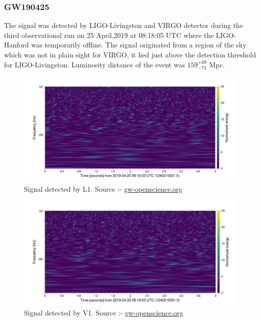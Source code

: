 \pagebreak

\subsubsection{GW190425}

The signal was detected by LIGO-Livingston and VIRGO detector during the third observational run on 25 April,2019 at 08:18:05 UTC where the LIGO-Hanford was temporarily offline. The signal originated from a region of the sky which was not in plain sight for VIRGO, it lied just above the detection threshold for LIGO-Livingston. Luminosity distance of the event was $159_{-71}^{+69}$ Mpc. \cite{GW190425_1}

\begin{figure}[htpb]
    \centering
    \includegraphics[scale=0.75]{images.tex/GW190425 L1.jpg}
    \caption{Signal detected by L1. Source :- \href{https://www.gw-openscience.org/eventapi/html/O3_Discovery_Papers/GW190425/v1/}{gw-openscience.org}}
    \end{figure}
    
\begin{figure}[htpb]
    \centering
    \includegraphics[scale=0.75]{images.tex/GW190425 V1.jpg}
    \caption{Signal detected by V1. Source :- \href{https://www.gw-openscience.org/eventapi/html/O3_Discovery_Papers/GW190425/v1/}{gw-openscience.org}}
\end{figure}


